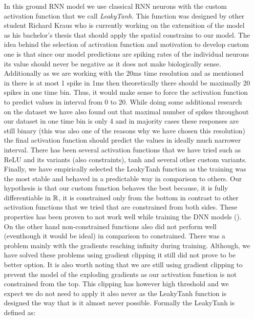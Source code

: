 In this ground RNN model we use classical RNN neurons with the custom activation function that we call \emph{LeakyTanh}. This function was designed by other student Richard Kraus who is currently working on the extensition of the model as his bachelor's thesis that should apply the spatial constrains to our model. The idea behind the selection of activation function and motivation to develop custom one is that since our model predictions are spiking rates of the individual neurons its value should never be negative as it does not make biologically sense. Additionally as we are working with the 20ms time resolution and as mentioned in \citet{dayan2005theoretical} there is at most 1 spike in 1ms then theoretically there should be maximally 20 spikes in one time bin. Thus, it would make sense to force the activation function to predict values in interval from 0 to 20. While doing some additional research on the dataset we have also found out that maximal number of spikes throughout our dataset in one time bin is only 4 and in majority cases these responses are still binary (this was also one of the reasons why we have chosen this resolution) the final activation function should predict the values in ideally much narrower interval. There has been several activation functions that we have tried such as ReLU and its variants (also constraints), tanh and several other custom variants. Finally, we have empirically selected the LeakyTanh function as the training was the most stable and behaved in a predictable way in comparison to others. Our hypothesis is that our custom function behaves the best because, it is fully differentiable in $\mathbb{R}$, it is constrained only from the bottom in contrast to other activation functions that we tried that are constrained from both sides. These properties has been proven to not work well while training the DNN models (\citet{shiv2022activation, nwankpa2018activationfunctionscomparisontrends}). On the other hand non-constrained functions also did not perform well (eventhough it would be ideal) in comparison to constrained. There was a problem mainly with the gradients reaching infinity during training. Although, we have solved these problems using gradient clipping it still did not prove to be better option. It is also worth noting that we are still using gradient clipping to prevent the model of the exploding gradients as our activation function is not constrained from the top. This clipping has however high threshold and we expect we do not need to apply it also never as the LeakyTanh function is designed the way that is it almost never possible. Formally the LeakyTanh is defined as:

